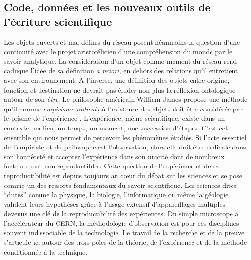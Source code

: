 \subsection[Code, données et les nouveaux outils de l{\textquoteright}écriture scientifique]{Code, données et les nouveaux outils de l{\textquoteright}écriture scientifique}

Les objets ouverts et mal définis du réseau posent néanmoins la question d{\textquoteright}une continuité avec le projet aristotélicien d{\textquoteright}une compréhension du monde par le savoir analytique. La considération d{\textquoteright}un objet comme moment du réseau rend caduque l{\textquoteright}idée de sa définition \textit{a priori, }en dehors des relations qu{\textquoteright}il entretient avec son environnement. A l{\textquoteright}inverse, une définition des objets entre origine, fonction et destination ne devrait pas éluder non plus la réflexion ontologique autour de son \textit{\^etre}. Le philosophe américain William James propose une méthode qu{\textquoteright}il nomme \textit{empirisme radical }o\`u l{\textquoteright}existence des objets doit \^etre considérée par le prisme de l{\textquoteright}expérience \citep{James1912}\textit{. }L{\textquoteright}expérience, m\^eme scientifique, existe dans un contexte, un lieu, un temps, un moment, une succession d{\textquoteright}étapes. C{\textquoteright}est cet ensemble qui nous permet de percevoir les phénomènes étudiés. Si l{\textquoteright}acte essentiel de l{\textquoteright}empiriste et du philosophe est l{\textquoteright}observation, alors elle doit \^etre radicale dans son honn\^eteté et accepter l{\textquoteright}expérience dans son unicité dont de nombreux facteurs sont non-reproductibles. Cette question de l{\textquoteright}expérience et de sa reproductibilité est depuis toujours au c{\oe}ur du débat sur les sciences et se pose comme un des ressorts fondamentaux du savoir scientifique. Les sciences dites {\textquotedblleft}dures{\textquotedblright} comme la physique, la biologie, l{\textquoteright}informatique ou m\^eme la géologie valident leurs hypothèses gr\^ace à l{\textquoteright}usage extensif d{\textquoteright}appareillages multiples devenus une clé de la reproductibilité des expériences. Du simple microscope à l{\textquoteright}accélérateur du CERN, la méthodologie d{\textquoteright}observation est pour ces disciplines souvent indissociable de la technologie. Le travail de la recherche et de la preuve s{\textquoteright}articule ici autour des trois p\^oles de la théorie, de l{\textquoteright}expérience et de la méthode conditionnée à la technique.  


